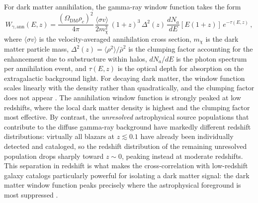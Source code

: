 For dark matter annihilation, the gamma-ray window function takes the form \cite{Fornengo:2013rga,Ando:2005xg}
\begin{equation}
	W_{\gamma,\mathrm{ann}}(E, z) = \frac{(\Omega_\mathrm{DM} \rho_c)^2}{4\pi}\, \frac{\langle \sigma v \rangle}{2 m_\chi^2}\, (1+z)^3\, \Delta^2(z)\, \frac{dN_a}{dE}[E(1+z)]\, e^{-\tau(E,z)}\,,
	\label{eq:window_dm_ann}
\end{equation}
where $\langle \sigma v \rangle$ is the velocity-averaged annihilation cross section, $m_\chi$ is the dark matter particle mass, $\Delta^2(z) = \langle \rho^2 \rangle / \bar{\rho}^2$ is the clumping factor accounting for the enhancement due to substructure within halos, $dN_a/dE$ is the photon spectrum per annihilation event, and $\tau(E,z)$ is the optical depth for absorption on the extragalactic background light.
For decaying dark matter, the window function scales linearly with the density rather than quadratically, and the clumping factor does not appear \cite{Fornengo:2013rga}.
The annihilation window function is strongly peaked at low redshifts, where the local dark matter density is highest and the clumping factor most effective.
By contrast, the \emph{unresolved} astrophysical source populations that contribute to the diffuse gamma-ray background have markedly different redshift distributions: virtually all blazars at $z \lesssim 0.1$ have already been individually detected and cataloged, so the redshift distribution of the remaining unresolved population drops sharply toward $z \sim 0$, peaking instead at moderate redshifts.
This separation in redshift is what makes the cross-correlation with low-redshift galaxy catalogs particularly powerful for isolating a dark matter signal: the dark matter window function peaks precisely where the astrophysical foreground is most suppressed \cite{Fornengo:2013rga}.

